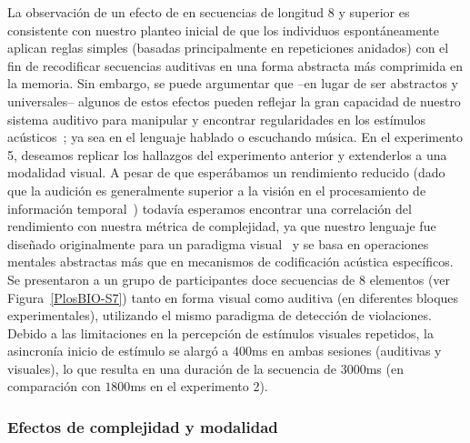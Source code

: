 La observación de un efecto de \mdlbin en secuencias de longitud 8 y superior es consistente con nuestro planteo inicial de que los individuos espontáneamente aplican reglas simples (basadas principalmente en repeticiones anidados) con el fin de recodificar secuencias auditivas en una forma abstracta más comprimida en la memoria. Sin embargo, se puede argumentar que --en lugar de ser abstractos y universales-- algunos de estos efectos pueden reflejar la gran capacidad de nuestro sistema auditivo para manipular y encontrar regularidades en los estímulos acústicos~\cite{f90}; ya sea en el lenguaje hablado o escuchando música. En el experimento 5, deseamos replicar los hallazgos del experimento anterior y extenderlos a una modalidad visual. A pesar de que esperábamos un rendimiento reducido (dado que la audición es generalmente superior a la visión en el procesamiento de información temporal~\cite{f91}) todavía esperamos encontrar una correlación del rendimiento con nuestra métrica de complejidad, ya que nuestro lenguaje fue diseñado originalmente para un paradigma visual~\cite{amalric2017language} y se basa en operaciones mentales abstractas más que en mecanismos de codificación acústica específicos. Se presentaron a un grupo de participantes doce secuencias de 8 elementos (ver Figura~\ref{PlosBIO-S7}) tanto en forma visual como auditiva (en diferentes bloques experimentales), utilizando el mismo paradigma de detección de violaciones. Debido a las limitaciones en la percepción de estímulos visuales repetidos, la asincronía inicio de estímulo se alargó a $400$ms en ambas sesiones (auditivas y visuales), lo que resulta en una duración de la secuencia de $3000$ms (en comparación con $1800$ms en el experimento 2).

\subsubsection*{Efectos de complejidad y modalidad}


